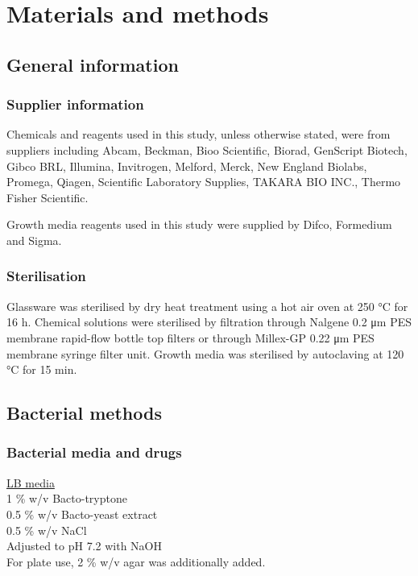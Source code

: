 \section{Materials and methods}

\subsection{General information}
\subsubsection{Supplier information}
Chemicals and reagents used in this study, unless otherwise stated, were from suppliers including Abcam, Beckman, Bioo Scientific, Biorad, GenScript Biotech, Gibco BRL, Illumina, Invitrogen, Melford, Merck, New England Biolabs, Promega, Qiagen, Scientific Laboratory Supplies, TAKARA BIO INC., Thermo Fisher Scientific. 

Growth media reagents used in this study were supplied by Difco, Formedium and Sigma. 
\subsubsection{Sterilisation}
Glassware was sterilised by dry heat treatment using a hot air oven at 250 \si{\celsius} for 16 \si{\hour}. Chemical solutions were sterilised by filtration through Nalgene 0.2 \si{\micro\metre} PES membrane rapid-flow bottle top filters or through Millex-GP 0.22 \si{\micro\metre} PES membrane syringe filter unit. Growth media was sterilised by autoclaving at 120 \si{\celsius} for 15 \si{\minute}. 

\subsection{Bacterial methods}
\subsubsection{Bacterial media and drugs}
\underline{LB media}\\ 
1 \% w/v Bacto-tryptone \\ 
0.5 \% w/v Bacto-yeast extract \\ 
0.5 \% w/v NaCl \\ 
Adjusted to pH 7.2 with NaOH \\
For plate use, 2 \% w/v agar was additionally added. \\

